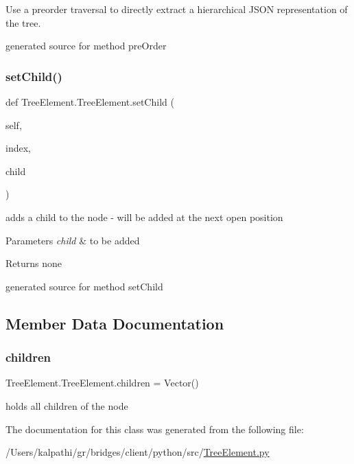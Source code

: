 Use a preorder traversal to directly extract a hierarchical J\+S\+ON representation of the tree. 

\begin{DoxyVerb}generated source for method preOrder \end{DoxyVerb}
 \hypertarget{class_tree_element_1_1_tree_element_a76f31a2d5d1481c1c314024fbcd73ea0}{}\label{class_tree_element_1_1_tree_element_a76f31a2d5d1481c1c314024fbcd73ea0} 
\subsubsection{\texorpdfstring{set\+Child()}{setChild()}}
{\footnotesize\ttfamily def Tree\+Element.\+Tree\+Element.\+set\+Child (\begin{DoxyParamCaption}\item[{}]{self,  }\item[{}]{index,  }\item[{}]{child }\end{DoxyParamCaption})}



adds a child to the node -\/ will be added at the next open position 


\begin{DoxyParams}{Parameters}
{\em child} & to be added\\
\hline
\end{DoxyParams}
\begin{DoxyReturn}{Returns}
none \begin{DoxyVerb}generated source for method setChild \end{DoxyVerb}
 
\end{DoxyReturn}


\subsection{Member Data Documentation}
\hypertarget{class_tree_element_1_1_tree_element_aebd379cad696c2537f6a055f087b906a}{}\label{class_tree_element_1_1_tree_element_aebd379cad696c2537f6a055f087b906a} 
\subsubsection{\texorpdfstring{children}{children}}
{\footnotesize\ttfamily Tree\+Element.\+Tree\+Element.\+children = Vector()\hspace{0.3cm}{\ttfamily [static]}}



holds all children of the node 



The documentation for this class was generated from the following file\+:\begin{DoxyCompactItemize}
\item 
/\+Users/kalpathi/gr/bridges/client/python/src/\hyperlink{_tree_element_8py}{Tree\+Element.\+py}\end{DoxyCompactItemize}
